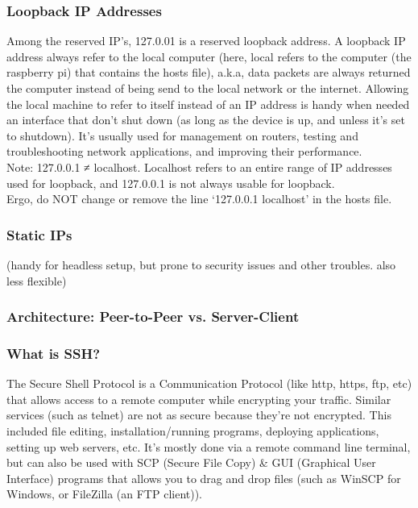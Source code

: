\documentclass[a4paper, 10pt]{article}
\begin{document}
            \subsubsection{Loopback IP Addresses}
                Among the reserved IP’s, 127.0.01 is a reserved loopback address. 
                A loopback IP address always refer to the local computer (here, local refers to the computer (the raspberry pi) that contains the hosts file), a.k.a, data packets are always returned the computer instead of being send to the local network or the internet. Allowing the local machine to refer to itself instead of an IP address is handy when needed an interface that don’t shut down (as long as the device is up, and unless it’s set to shutdown). It’s usually used for management on routers, testing and troubleshooting network applications, and improving their performance.  \\

                Note: 127.0.0.1 ≠ localhost. Localhost refers to an entire range of IP addresses used for loopback, and 127.0.0.1 is not always usable for loopback. \\

                \noindent Ergo, do NOT change or remove the line ‘127.0.0.1 localhost’ in the hosts file.

            \subsubsection{Static IPs}
                (handy for headless setup, but prone to security issues and other troubles. also less flexible)

            \subsubsection{Architecture: Peer-to-Peer vs. Server-Client}
            \subsubsection{What is SSH?}
                The Secure Shell Protocol is a Communication Protocol (like http, https, ftp, etc) that allows access to a remote computer while encrypting your traffic. Similar services (such as telnet) are not as secure because they’re not encrypted. This included file editing, installation/running programs, deploying applications, setting up web servers, etc. It’s mostly done via a remote command line terminal, but can also be used with SCP (Secure File Copy) & GUI (Graphical User Interface) programs that allows you to drag and drop files (such as WinSCP for Windows, or FileZilla (an FTP client)). \\
\end{document}
